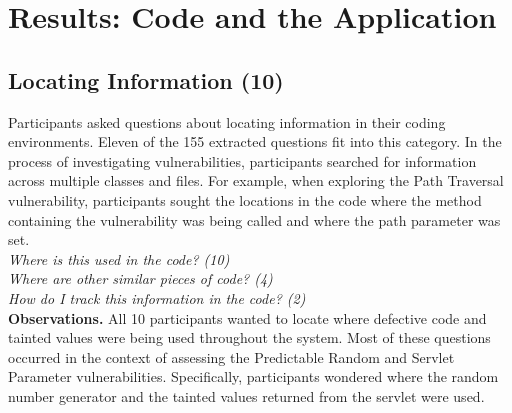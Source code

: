 \documentclass[conference]{IEEEtran}
\begin{document}


\section{Results: Code and the Application}
\label{sec:results-ca}





\noindent\subsection{\textbf{Locating Information (10)}}\label{li}

Participants asked questions about locating information in their coding environments. 
Eleven of the 155 extracted questions fit into this category.
In the process of investigating vulnerabilities, participants searched for information across multiple classes and files.
For example, when exploring the Path Traversal vulnerability, participants sought the locations in the code where the method containing the vulnerability was being called and where the path parameter was set.
\\

\noindent\emph{Where is this used in the code? (10)} \\
\emph{Where are other similar pieces of code? (4)} \\
\emph{How do I track this information in the code? (2)} \\



\noindent\textbf{Observations.}
All 10 participants wanted to locate where defective code and tainted values were being used throughout the system. 
Most of these questions occurred in the context of assessing the Predictable Random and Servlet Parameter vulnerabilities.
Specifically, participants wondered where the random number generator and the tainted values returned from the servlet were used.
\end{document}
